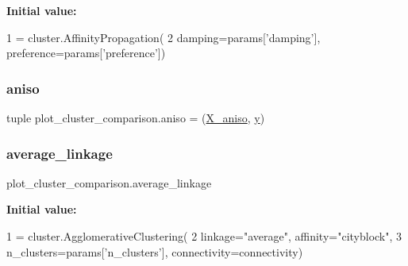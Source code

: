 {\bfseries Initial value\+:}
\begin{DoxyCode}
1 =  cluster.AffinityPropagation(
2         damping=params[\textcolor{stringliteral}{'damping'}], preference=params[\textcolor{stringliteral}{'preference'}])
\end{DoxyCode}
\mbox{\label{namespaceplot__cluster__comparison_a164bf5ca336400f3ed6eb956b9d04552}} 
\subsubsection{\texorpdfstring{aniso}{aniso}}
{\footnotesize\ttfamily tuple plot\+\_\+cluster\+\_\+comparison.\+aniso = (\hyperlink{namespaceplot__cluster__comparison_a4bce070b36506c646cb5b702fc953298}{X\+\_\+aniso}, \hyperlink{namespaceplot__cluster__comparison_a4341eac9f6e009470760b4e123c2acad}{y})}

\mbox{\label{namespaceplot__cluster__comparison_a85d29d2dbcec5c46b4b3dbc72f6185a3}} 
\subsubsection{\texorpdfstring{average\+\_\+linkage}{average\_linkage}}
{\footnotesize\ttfamily plot\+\_\+cluster\+\_\+comparison.\+average\+\_\+linkage}

{\bfseries Initial value\+:}
\begin{DoxyCode}
1 =  cluster.AgglomerativeClustering(
2         linkage=\textcolor{stringliteral}{"average"}, affinity=\textcolor{stringliteral}{"cityblock"},
3         n\_clusters=params[\textcolor{stringliteral}{'n\_clusters'}], connectivity=connectivity)
\end{DoxyCode}
\mbox{\label{namespaceplot__cluster__comparison_a3628421ec7ed08e955e49826b638402b}} 
